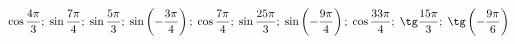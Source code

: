 \begin{ex}[type=calculate]
	\begin{condition}
		\( \cos\dfrac{4\pi}{3};\;\sin\dfrac{7\pi}{4};\;\sin\dfrac{5\pi}{3};\;\sin\left( -\dfrac{3\pi}{4} \right);\;\cos\dfrac{7\pi}{4};\;\sin\dfrac{25\pi}{3};\;\sin\left( -\dfrac{9\pi}{4}  \right);\;\cos\dfrac{33\pi}{4};\;\tg\dfrac{15\pi}{3};\;\tg\left( -\dfrac{9\pi}{6}  \right)\)
	\end{condition}
\end{ex}